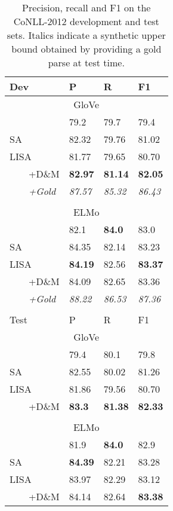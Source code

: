 \documentclass[11pt,a4paper]{article}
\begin{document}
\begin{table}
\begin{tabular}{llll}
Dev & P & R & F1 \\ \hline \hline
\multicolumn{4}{c}{GloVe} \\ \hline
\citet{he2018jointly} & 79.2 & 79.7 & 79.4 \\ \hline
SA & 82.32 & 79.76 & 81.02 \\ LISA & 81.77 & 79.65 & 80.70 \\
\ \ \ \ +D\&M & {\bf 82.97} & {\bf 81.14} &	{\bf 82.05} \\
\ \ \ \ \emph{+Gold} & \emph{87.57} & \emph{85.32} & \emph{86.43} \\ 
\hline
 & & & \\
\multicolumn{4}{c}{ELMo} \\ \hline
\citet{he2018jointly} & 82.1 & {\bf 84.0} & 83.0 \\ \hline
SA & 84.35 & 82.14 & 83.23 \\ LISA & {\bf 84.19} & 82.56 & {\bf 83.37} \\
\ \ \ \ +D\&M & 84.09 & 82.65 & 83.36 \\
\ \ \ \ \emph{+Gold} & \emph{88.22} & \emph{86.53} & \emph{87.36} \\

 & & & \\
Test &  P & R & F1 \\ \hline \hline
\multicolumn{4}{c}{GloVe} \\ \hline
\citet{he2018jointly} & 79.4 & 80.1 & 79.8 \\ \hline
SA & 82.55 & 80.02 & 81.26 \\ LISA &  81.86 &	79.56 &	80.70 \\ \ \ \ \ +D\&M & {\bf 83.3} & {\bf 81.38} &	{\bf 82.33} \\ \hline
 & & & \\
\multicolumn{4}{c}{ELMo} \\ \hline
\citet{he2018jointly} & 81.9 & {\bf 84.0} & 82.9 \\ \hline
SA & {\bf 84.39} & 82.21 & 83.28 \\ LISA & 83.97 & 82.29 & 83.12 \\
\ \ \ \ +D\&M & 84.14 & 82.64 & {\bf 83.38} \\	

\end{tabular}
\caption{Precision, recall and F1 on the CoNLL-2012 development and test sets. Italics indicate a synthetic upper bound obtained by providing a gold parse at test time.\label{tab:conll12-results}}
\end{table}
\end{document}
